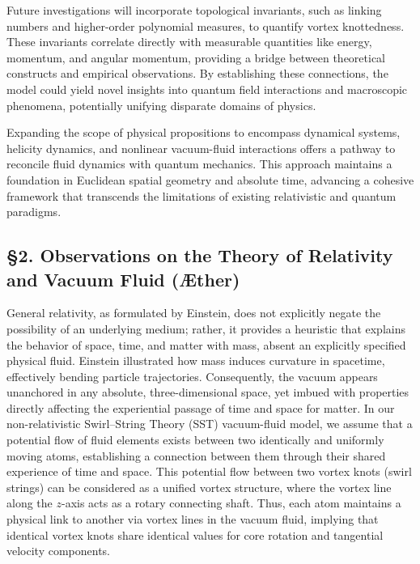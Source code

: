 \documentclass[10pt,reprint,aps,onecolumn,nofootinbib]{revtex4-2}
\begin{document}
        Future investigations will incorporate topological invariants, such as linking numbers and higher-order polynomial measures, to quantify vortex knottedness.\cite{Moffatt1969,Ricca2009} These invariants correlate directly with measurable quantities like energy, momentum, and angular momentum, providing a bridge between theoretical constructs and empirical observations. By establishing these connections, the model could yield novel insights into quantum field interactions and macroscopic phenomena, potentially unifying disparate domains of physics.

        Expanding the scope of physical propositions to encompass dynamical systems, helicity dynamics, and nonlinear vacuum-fluid interactions offers a pathway to reconcile fluid dynamics with quantum mechanics. This approach maintains a foundation in Euclidean spatial geometry and absolute time, advancing a cohesive framework that transcends the limitations of existing relativistic and quantum paradigms.

        \subsection*{§2. Observations on the Theory of Relativity and Vacuum Fluid (Æther)}

            General relativity, as formulated by Einstein, does not explicitly negate the possibility of an underlying medium; rather, it provides a heuristic that explains the behavior of space, time, and matter with mass, absent an explicitly specified physical fluid.\cite{Einstein1916} Einstein illustrated how mass induces curvature in spacetime, effectively bending particle trajectories. Consequently, the vacuum appears unanchored in any absolute, three-dimensional space, yet imbued with properties directly affecting the experiential passage of time and space for matter. In our non-relativistic Swirl--String Theory (SST) vacuum-fluid model, we assume that a potential flow of fluid elements exists between two identically and uniformly moving atoms, establishing a connection between them through their shared experience of time and space. This potential flow between two vortex knots (swirl strings) can be considered as a unified vortex structure, where the vortex line along the \(z\)-axis acts as a rotary connecting shaft. Thus, each atom maintains a physical link to another via vortex lines in the vacuum fluid, implying that identical vortex knots share identical values for core rotation and tangential velocity components.
\end{document}
